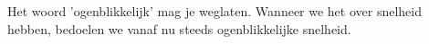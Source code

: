 \documentclass{ximera}
\begin{document}




\begin{remark}
	Het woord 'ogenblikkelijk' mag je weglaten. Wanneer we het over snelheid hebben, bedoelen we vanaf nu steeds ogenblikkelijke snelheid.
\end{remark}
\end{document}
